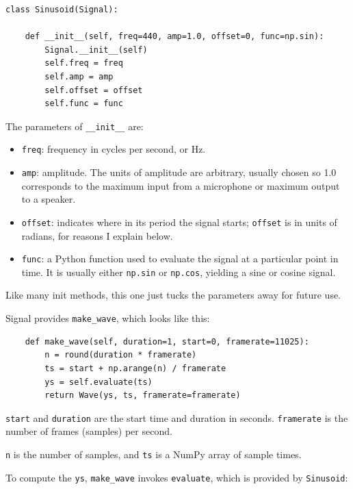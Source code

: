 \documentclass[12pt]{book}
\begin{document}
\begin{verbatim}
class Sinusoid(Signal):

    def __init__(self, freq=440, amp=1.0, offset=0, func=np.sin):
        Signal.__init__(self)
        self.freq = freq
        self.amp = amp
        self.offset = offset
        self.func = func
\end{verbatim}

The parameters of \verb"__init__" are:

\begin{itemize}

\item {\tt freq}: frequency in cycles per second, or Hz.

\item {\tt amp}: amplitude.  The units of amplitude are arbitrary,
usually chosen so 1.0 corresponds to the maximum input from a
microphone or maximum output to a speaker.

\item {\tt offset}: indicates where in its period the signal starts;
{\tt offset} is in units of radians, for reasons I explain below.

\item {\tt func}: a Python function used
to evaluate the signal at a particular point in time.  It is
usually either {\tt np.sin} or {\tt np.cos}, yielding a sine or
cosine signal.

\end{itemize}

Like many init methods, this one just tucks the parameters away for
future use.

Signal provides \verb"make_wave", which looks like
this:

\begin{verbatim}
    def make_wave(self, duration=1, start=0, framerate=11025):
        n = round(duration * framerate)
        ts = start + np.arange(n) / framerate
        ys = self.evaluate(ts)
        return Wave(ys, ts, framerate=framerate)
\end{verbatim}

{\tt start} and {\tt duration} are the start time and duration
in seconds.  {\tt framerate} is the number of frames (samples)
per second.

{\tt n} is the number of samples, and {\tt ts} is a NumPy array
of sample times.

To compute the {\tt ys}, \verb"make_wave" invokes {\tt evaluate},
which is provided by {\tt Sinusoid}:
\end{document}
